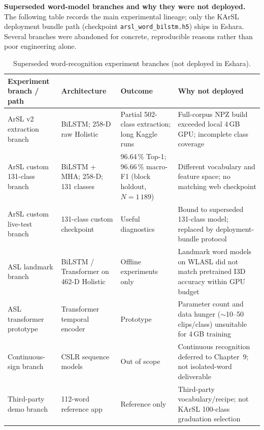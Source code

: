 \noindent\textbf{Superseded word-model branches and why they were not deployed.} The following table records the main experimental lineage; only the KArSL deployment bundle path (checkpoint \texttt{arsl\_word\_bilstm.h5}) ships in Eshara. Several branches were abandoned for concrete, reproducible reasons rather than poor engineering alone.\par\vspace{0.3cm}

\begin{table}[H]
\centering
\caption{Superseded word-recognition experiment branches (not deployed in Eshara).}
\label{tab:ch6-superseded}
\small
\renewcommand{\arraystretch}{2.5} %
\begin{tabular}{|P{4.0cm}|P{3.0cm}|P{2.5cm}|P{5.5cm}|}
\hline
\textbf{Experiment branch / path} & \textbf{Architecture} & \textbf{Outcome} & \textbf{Why not deployed} \\ \hline
ArSL v2 extraction branch & BiLSTM; 258-D raw Holistic & Partial 502-class extraction; long Kaggle runs & Full-corpus NPZ build exceeded local 4\,GB GPU; incomplete class coverage \\ \hline
ArSL custom 131-class branch & BiLSTM + MHA; 258-D; 131 classes & 96.64\,\% Top-1; 96.66\,\% macro-F1 (block holdout, $N{=}1\,189$) & Different vocabulary and feature space; no matching web checkpoint \\ \hline
ArSL custom live-test branch & 131-class custom checkpoint & Useful diagnostics & Bound to superseded 131-class model; replaced by deployment-bundle protocol \\ \hline
ASL landmark branch & BiLSTM / Transformer on 462-D Holistic & Offline experiments only & Landmark word models on WLASL did not match pretrained I3D accuracy within GPU budget \\ \hline
ASL transformer prototype & Transformer temporal encoder & Prototype & Parameter count and data hunger ($\sim$10--50 clips/class) unsuitable for 4\,GB training \\ \hline
Continuous-sign branch & CSLR sequence models & Out of scope & Continuous recognition deferred to Chapter~9; not isolated-word deliverable \\ \hline
Third-party demo branch & 112-word reference app & Reference only & Third-party vocabulary/recipe; not KArSL 100-class graduation selection \\ \hline
\end{tabular}
\end{table}

